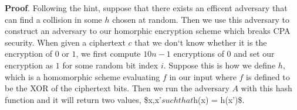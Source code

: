 \documentclass{article}
\begin{document}
\begin{enumerate}
\begin{mdbmarginx}{1ex}{0pt}{1ex}{0pt}%
\noindent{}\textbf{Proof}.  Following the hint, suppose that there exists an efficent adversary that can find a collision in
some $h$ chosen at random. Then we use this adversary to construct an adversary to our homorphic
encryption scheme which breaks CPA security. When given a ciphertext $c$ that we don\textquoteleft{}t know whether
it is the encryption of $0$ or $1$, we first compute $10n -1$ encryptions of $0$ and set our 
encryption as $1$ for some random bit index $i$. Suppose this is how we define $h$, which is a homomorphic
scheme evaluating $f$ in our input where $f$ is defined to be the XOR of the ciphertext bits.
Then we run the adversary $A$ with this hash function and it will return two values, \$x,x\textquoteright{}$ such that $h(x) = h(x')\$.%
\end{mdbmarginx}%
\end{enumerate}%
\end{document}
